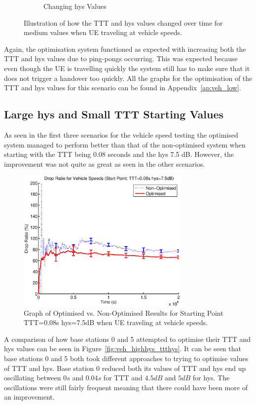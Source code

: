 \begin{figure}[H]
\begin{subfigure}[b]{0.49\textwidth}
                \caption{Changing hys Values}
                \label{fig:veh_low_hys}
        \end{subfigure}
        \caption{Illustration of how the TTT and hys values changed over time for medium values when UE traveling at vehicle speeds.}\label{fig:veh_low_ttthys}
\end{figure}
Again, the optimisation system functioned as expected with increasing both the TTT and hys values due to ping-pongs occurring. This was expected because even though the UE is travelling quickly the system still has to make sure that it does not trigger a handover too quickly. All the graphs for the optimisation of the TTT and hys values for this scenario can be found in Appendix~\ref{ap:veh_low}.
\subsection{Large hys and Small TTT Starting Values}
As seen in the first three scenarios for the vehicle speed testing the optimised system managed to perform better than that of the non-optimised system when starting with the TTT being 0.08 seconds and the hys 7.5 dB. However, the improvement was not quite as great as seen in the other scenarios. 
\begin{figure}[H]
  \begin{center}
    	  \includegraphics[width=0.75\textwidth]{figures/vehicle_figures/vehhighhys.eps}
    \end{center}
    \caption{Graph of Optimised vs. Non-Optimised Results for Starting Point TTT=0.08s hys=7.5dB when UE traveling at vehicle speeds.}
    \label{fig:veh_highhys_drop}
\end{figure}
A comparison of how base stations 0 and 5 attempted to optimise their TTT and hys values can be seen in Figure~\ref{fig:veh_highhys_ttthys}. It can be seen that base stations 0 and 5 both took different approaches to trying to optimise values of TTT and hys. Base station 0 reduced both its values of TTT and hys end up oscillating between $0 s$ and $0.04 s$ for TTT and $4.5 dB$ and $5 dB$ for hys. The oscillations were still fairly frequent meaning that there could have been more of an improvement.

